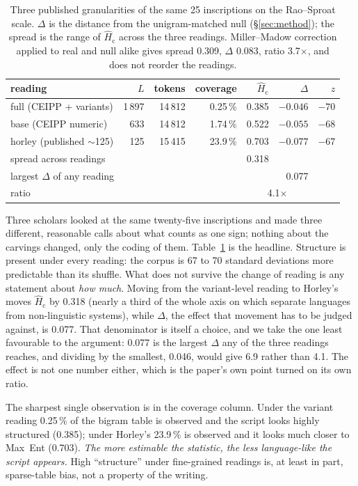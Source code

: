 \documentclass[11pt,a4paper]{article}
\newcommand{\Hcn}{\hat H_{\mathrm{c}}}
\begin{document}
\begin{table}[t]
\centering\small
\begin{tabular}{lrrrrrr}
\toprule
reading & $L$ & tokens & coverage & $\Hcn$ & $\Delta$ & $z$ \\
\midrule
full (CEIPP + variants) & 1\,897 & 14\,812 & 0.25\,\% & 0.385 & $-0.046$ & $-70$ \\
base (CEIPP numeric)    &   633 & 14\,812 & 1.74\,\% & 0.522 & $-0.055$ & $-68$ \\
horley (published $\sim$125) & 125 & 15\,415 & 23.9\,\% & 0.703 & $-0.077$ & $-67$ \\
\midrule
\multicolumn{4}{l}{spread across readings} & 0.318 & & \\
\multicolumn{4}{l}{largest $\Delta$ of any reading} & & 0.077 & \\
\multicolumn{4}{l}{ratio} & \multicolumn{2}{c}{4.1$\times$} & \\
\bottomrule
\end{tabular}
\caption{Three published granularities of the same 25 inscriptions on the Rao--Sproat scale. $\Delta$ is the distance from the unigram-matched null (\S\ref{sec:method}); the spread is the range of $\Hcn$ across the three readings. Miller--Madow correction applied to real and null alike gives spread 0.309, $\Delta$ 0.083, ratio 3.7$\times$, and does not reorder the readings.}
\label{tab:ladder}
\end{table}

Three scholars looked at the same twenty-five inscriptions and made three different, reasonable calls about what counts as one sign; nothing about the carvings changed, only the coding of them. Table~\ref{tab:ladder} is the headline. Structure is present under every reading: the corpus is 67 to 70 standard deviations more predictable than its shuffle. What does not survive the change of reading is any statement about \emph{how much}. Moving from the variant-level reading to Horley's moves $\Hcn$ by 0.318 (nearly a third of the whole axis on which \citet{rao2010reply} separate languages from non-linguistic systems), while $\Delta$, the effect that movement has to be judged against, is 0.077. That denominator is itself a choice, and we take the one least favourable to the argument: 0.077 is the largest $\Delta$ any of the three readings reaches, and dividing by the smallest, 0.046, would give 6.9 rather than 4.1. The effect is not one number either, which is the paper's own point turned on its own ratio.

The sharpest single observation is in the coverage column. Under the variant reading 0.25\,\% of the bigram table is observed and the script looks highly structured (0.385); under Horley's 23.9\,\% is observed and it looks much closer to Max~Ent (0.703). \emph{The more estimable the statistic, the less language-like the script appears.} High ``structure'' under fine-grained readings is, at least in part, sparse-table bias, not a property of the writing.
\end{document}
